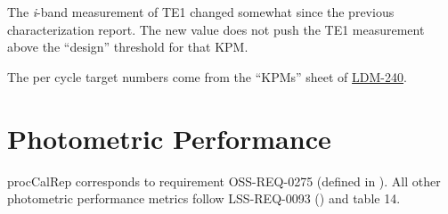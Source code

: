 \documentclass[DM,lsstdraft,toc]{lsstdoc}
\begin{document}
The \emph{i}-band measurement of TE1 changed somewhat since the previous characterization report.  The new value does not push the TE1 measurement above the ``design'' threshold for that KPM.

The per cycle target numbers come from the ``KPMs'' sheet of \href{http://ls.st/LDM-240}{LDM-240}.

\section{Photometric Performance}\label{photometric-performance}


procCalRep corresponds to requirement OSS-REQ-0275 (defined in
). All other photometric performance
metrics follow LSS-REQ-0093 () and
 table 14.
\end{document}
